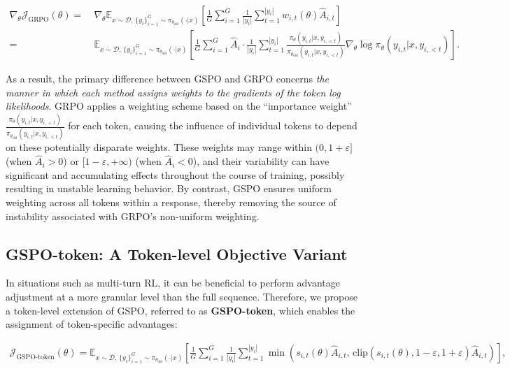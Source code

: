 \begin{align}
\nabla_{\theta} \mathcal{J}_\text{GRPO} (\theta) 
=&\ 
\nabla_{\theta} \mathbb{E}_{ x \sim \mathcal{D},\, \{y_i\}_{i=1}^G \sim \pi_{\theta_\text{old}}( \cdot | x) }
\left[ \frac{1}{G} \sum_{i=1}^{G} \frac{1}{|y_i|} \sum_{t=1}^{|y_i|} 
w_{i,t}(\theta) \widehat{A}_{i,t}
\right] \\
=&\
\mathbb{E}_{ x \sim \mathcal{D},\, \{y_i\}_{i=1}^G \sim \pi_{\theta_\text{old}}( \cdot | x) }
\left[ \frac{1}{G} \sum_{i=1}^{G} \widehat{A}_{i} 
\cdot \frac{1}{|y_i|} \sum_{t=1}^{|y_i|} 
\frac{ \pi_{\theta} (y_{i,t} | x, y_{i,<t}) }{ \pi_{\theta_\text{old}} (y_{i,t} | x,y_{i,<t})} 
\nabla_{\theta} \log \pi_{\theta} (y_{i,t} | x, y_{i,<t})  
\right].
\end{align}

As a result, the primary difference between GSPO and GRPO concerns \textit{the manner in which each method assigns weights to the gradients of the token log likelihoods}. GRPO applies a weighting scheme based on the ``importance weight'' $\frac{ \pi_{\theta} (y_{i,t} | x, y_{i,<t}) }{ \pi_{\theta_\text{old}} (y_{i,t} | x,y_{i,<t})}$ for each token, causing the influence of individual tokens to depend on these potentially disparate weights. These weights may range within $(0, 1+\varepsilon]$ (when $\widehat{A}_{i} > 0$) or $[1-\varepsilon, +\infty)$ (when $\widehat{A}_{i} < 0$), and their variability can have significant and accumulating effects throughout the course of training, possibly resulting in unstable learning behavior. By contrast, GSPO ensures uniform weighting across all tokens within a response, thereby removing the source of instability associated with GRPO's non-uniform weighting.

\subsection{GSPO-token: A Token-level Objective Variant}

In situations such as multi-turn RL, it can be beneficial to perform advantage adjustment at a more granular level than the full sequence. Therefore, we propose a token-level extension of GSPO, referred to as \textbf{GSPO-token}, which enables the assignment of token-specific advantages:

\begin{align}
\mathcal{J}_\text{GSPO-token}(\theta)
=
\mathbb{E}_{ x \sim \mathcal{D},\, \{y_i\}_{i=1}^G \sim \pi_{\theta_\text{old}}( \cdot | x) }
\left[ 
\frac{1}{G} \sum_{i=1}^{G} \frac{1}{|y_i|} \sum_{t=1}^{|y_i|} 
\min \left( s_{i,t}(\theta) \widehat{A}_{i,t},  \, \mathrm{clip} \left( s_{i,t}(\theta), 1 - {\varepsilon}, 1 + {\varepsilon} \right) \widehat{A}_{i,t} \right) 
\right],
\label{equ:gspo-token}
\end{align}


